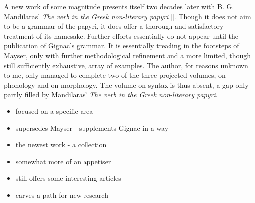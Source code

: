 A new work of some magnitude presents itself two decades later with B. G.
Mandilaras' \textit{The verb in the Greek non-literary papyri}
[\citeyear{mandilaras1973}]. Though it does not aim to be a grammar of the
papyri, it does offer a thorough and satisfactory treatment of its namesake.
Further efforts essentially do not appear until the publication of Gignac's
grammar. It is essentially treading in the footsteps of Mayser, only with
further methodological refinement and a more limited, though still sufficiently
exhaustive, array of examples. The author, for reasons unknown to me, only
managed to complete two of the three projected volumes, on phonology and on
morphology. The volume on syntax is thus absent, a gap only partly filled by
Mandilaras' \textit{The verb in the Greek non-literary papyri}.

\begin{itemize}
\item focused on a specific area
\item supersedes Mayser - supplements Gignac in a way
\end{itemize}

\begin{itemize}
\item the newest work - a collection
\item somewhat more of an appetiser
\item still offers some interesting articles
\item carves a path for new research
\end{itemize}
